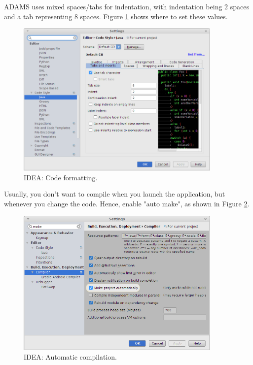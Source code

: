 ADAMS uses mixed spaces/tabs for indentation, with indentation being 2 spaces
and a tab representing 8 spaces. Figure \ref{intellij-indentation} shows where
to set these values.
\begin{figure}[htb]
  \centering
  \includegraphics[width=10.0cm]{images/intellij-indentation.png}
  \caption{IDEA: Code formatting.}
  \label{intellij-indentation}
\end{figure}

Usually, you don't want to compile when you launch the application, but
whenever you change the code. Hence, enable "auto make", as shown in
Figure \ref{intellij-make}.
\begin{figure}[htb]
  \centering
  \includegraphics[width=10.0cm]{images/intellij-make.png}
  \caption{IDEA: Automatic compilation.}
  \label{intellij-make}
\end{figure}

